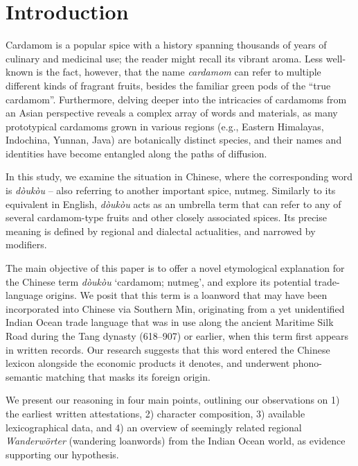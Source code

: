 \documentclass[12pt]{article}
\newcommand{\tc}[1]{\traditionalchinesefont{#1}\rmfamily}
\begin{document}
\clearpage



\section{Introduction}

Cardamom is a popular spice with a history spanning thousands of years of culinary and medicinal use; the reader might recall its vibrant aroma. Less well-known is the fact, however, that the name \textit{cardamom} can refer to multiple different kinds of fragrant fruits, besides the familiar green pods of the ``true cardamom''. Furthermore, delving deeper into the intricacies of cardamoms from an Asian perspective reveals a complex array of words and materials, as many prototypical cardamoms grown in various regions (e.g., Eastern Himalayas, Indochina, Yunnan, Java) are botanically distinct species, and their names and identities have become entangled along the paths of diffusion.

In this study, we examine the situation in Chinese, where the corresponding word is \tc{豆蔻} \textit{dòukòu} -- also referring to another important spice, nutmeg. Similarly to its equivalent in English, \textit{dòukòu} acts as an umbrella term that can refer to any of several cardamom-type fruits and other closely associated spices. Its precise meaning is defined by regional and dialectal actualities, and narrowed by modifiers.

The main objective of this paper is to offer a novel etymological explanation for the Chinese term \textit{dòukòu} `cardamom; nutmeg', and explore its potential trade-language origins. We posit that this term is a loanword that may have been incorporated into Chinese via Southern Min, originating from a yet unidentified Indian Ocean trade language that was in use along the ancient Maritime Silk Road during the Tang dynasty (618--907) or earlier, when this term first appears in written records. Our research suggests that this word entered the Chinese lexicon alongside the economic products it denotes, and underwent phono-semantic matching that masks its foreign origin. 

We present our reasoning in four main points, outlining our observations on 1) the earliest written attestations, 2) character composition, 3) available lexicographical data, and 4) an overview of seemingly related regional \textit{Wanderwörter} (wandering loanwords) from the Indian Ocean world, as evidence supporting our hypothesis.
\end{document}
